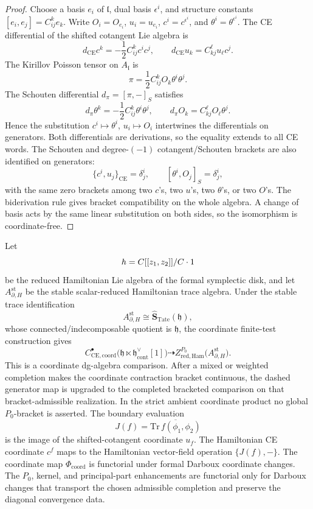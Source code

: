 \documentclass[11pt]{memoir}
\begin{document}
\begin{proof}
  Choose a basis \(e_i\) of \(\mathfrak l\), dual basis \(\epsilon^i\), and
  structure constants \([e_i,e_j]=C^k_{ij}e_k\). Write \(O_i=O_{e_i}\),
  \(u_i=u_{e_i}\), \(c^i=c^{\epsilon^i}\), and
  \(\theta^i=\theta^{\epsilon^i}\). The CE differential of the shifted
  cotangent Lie algebra is
  \[
    d_{\mathrm{CE}}c^k=-\frac12 C^k_{ij}c^ic^j,\qquad
    d_{\mathrm{CE}}u_k=C^\ell_{kj}u_\ell c^j.
  \]
  The Kirillov Poisson tensor on \(A_{\mathfrak l}\) is
  \[
    \pi=\frac12 C^k_{ij}O_k\theta^i\theta^j.
  \]
  The Schouten differential \(d_\pi=[\pi,-]_S\) satisfies
  \[
    d_\pi\theta^k=-\frac12 C^k_{ij}\theta^i\theta^j,\qquad
    d_\pi O_k=C^\ell_{kj}O_\ell\theta^j.
  \]
  Hence the substitution \(c^i\mapsto\theta^i\), \(u_i\mapsto O_i\)
  intertwines the differentials on generators. Both differentials are
  derivations, so the equality extends to all CE words. The Schouten and
  degree-\((-1)\) cotangent/Schouten brackets are also identified on
  generators:
  \[
    \{c^i,u_j\}_{\mathrm{CE}}=\delta^i_j,\qquad
    [\theta^i,O_j]_S=\delta^i_j,
  \]
  with the same zero brackets among two \(c\)'s, two \(u\)'s, two
  \(\theta\)'s, or two \(O\)'s. The biderivation rule gives bracket
  compatibility on the whole algebra. A change of basis acts by the same
  linear substitution on both sides, so the isomorphism is coordinate-free.
\end{proof}

\begin{thm}
  \label{thm:coordinate-free-closed-open-synthesis}
  Let
  \[
    h=C[[z_1,z_2]]/C\cdot1
  \]
  be the reduced Hamiltonian Lie algebra of the formal symplectic disk, and
  let \(A_{\partial,H}^{\mathrm{st}}\) be the stable scalar-reduced
  Hamiltonian trace algebra. Under the stable trace identification
  \[
    A_{\partial,H}^{\mathrm{st}}
      \cong \widehat{\mathbf S}_{\mathrm{Tate}}(\mathfrak h),
  \]
  whose connected/indecomposable quotient is \(\mathfrak h\), the
  coordinate finite-test construction gives
  \[
    C^\bullet_{\mathrm{CE},\mathrm{coord}}
    \bigl(\mathfrak h\ltimes\mathfrak h^\vee_{\mathrm{cont}}[1]\bigr)
      \dashrightarrow
    Z^{P_0}_{\mathrm{red,Ham}}
    \bigl(A_{\partial,H}^{\mathrm{st}}\bigr).
  \]
  This is a coordinate dg-algebra comparison.  After a mixed or weighted
  completion makes the coordinate contraction bracket continuous, the
  dashed generator map is upgraded to the completed bracketed comparison
  on that bracket-admissible realization.  In the strict ambient
  coordinate product no global \(P_0\)-bracket is asserted.
  The boundary evaluation
  \[
    J(f)=\overline{\mathrm{Tr}\,f(\phi_1,\phi_2)}
  \]
  is the image of the shifted-cotangent coordinate \(u_f\). The Hamiltonian
  CE coordinate \(c^f\) maps to the Hamiltonian vector-field operation
  \(\{J(f),-\}\). The coordinate map \(\Phi_{\mathrm{coord}}\) is functorial
  under formal Darboux coordinate changes.  The \(P_0\), kernel, and
  principal-part enhancements are functorial only for Darboux changes
  that transport the chosen admissible completion and preserve the
  diagonal convergence data.
\end{thm}
\end{document}
